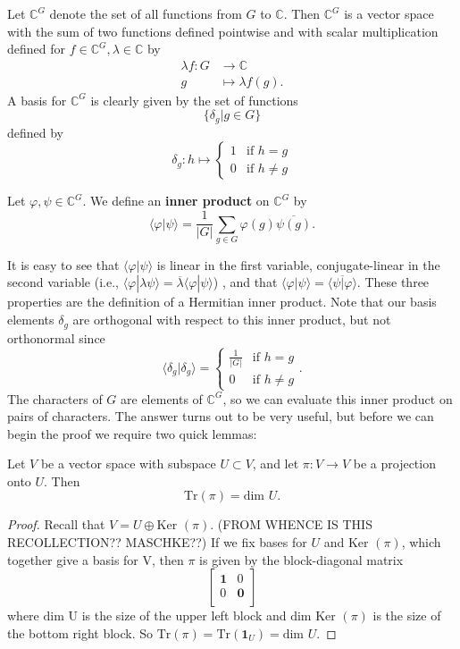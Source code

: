 \begin{defn}
Let $\mathbb{C}^G$ denote the set of all functions from $G$ to $\mathbb{C}$.  Then $\mathbb{C}^G$ is a vector space with the sum of two functions defined pointwise and with scalar multiplication defined for $f \in \mathbb{C}^G, \lambda \in \mathbb{C}$ by 
\begin{align*}
\lambda f \colon G &\to \mathbb{C} \\
g &\mapsto \lambda f(g).
\end{align*}
A basis for $\mathbb{C}^G$ is clearly given by the set of functions 
\[\{ \delta_g | g \in G  \} \]
defined by 
\[ \delta_g \colon h \mapsto \begin{cases}  1 &\text{if } h = g \\
 0 &\text{if } h \neq g
\end{cases} \]
\end{defn}

\begin{defn}
Let $\varphi, \psi \in \mathbb{C}^G$.  We define an \textbf{inner product}  on $\mathbb{C}^G$ by 
\[ \langle \varphi | \psi \rangle = \frac{1}{|G|} \sum_{g \in G} \varphi(g) \overline{\psi(g)}.\]
\end{defn}
It is easy to see that $\langle \varphi | \psi \rangle$ is linear in the first variable, conjugate-linear in the second variable (i.e., $\langle \varphi | \lambda \psi \rangle = \overline{\lambda}	\langle \varphi | \psi \rangle$) , and that $\langle \varphi | \psi \rangle = \overline {\langle \psi | \varphi \rangle}$.  These three properties are the definition of a Hermitian inner product.  Note that our basis elements $\delta_g$ are orthogonal with respect to this inner product, but not orthonormal since 
\[ \langle \delta_g | \delta_g \rangle = \begin{cases} \frac{1}{|G|} &\mbox{if } h = g \\ 0 &\mbox{if } h \neq g \end{cases}. \]
The characters of $G$ are elements of $\mathbb{C}^G$, so we can evaluate this inner product on pairs of characters.  The answer turns out to be very useful, but before we can begin the proof we require two quick lemmas:

\begin{lemma} \label{projection-lemma}
Let $V$ be a vector space with subspace $U \subset V$, and let $\pi \colon V \to V$ be a projection onto $U$.  Then 
\[ \text{Tr}(\pi) = \text{dim } U. \]
\end{lemma}
\begin{proof}
Recall that $V = U \oplus \text{Ker }(\pi)$.  (FROM WHENCE IS THIS RECOLLECTION??  MASCHKE??)  If we fix bases for $U$ and $\text{Ker }(\pi)$, which together give a basis for V, then $\pi$ is given by the block-diagonal matrix
\[   \begin{bmatrix}
\mathbf{1} & 0 \\
0 & \mathbf{0} \\
\end{bmatrix} \]
where $\text{dim U}$ is the size of the upper left block and $\text{dim Ker }(\pi)$ is the size of the bottom right block.  So $\text{Tr}(\pi) = \text{Tr}(\mathbf{1}_U) = \text{dim } U$.
\end{proof}

